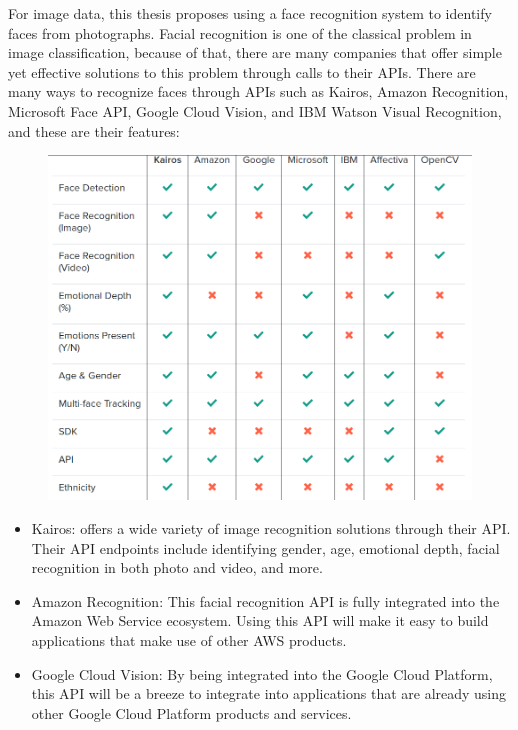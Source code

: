 For image data, this thesis proposes using a face recognition system to identify faces from photographs. Facial recognition is one of the classical problem in image classification, because of that, there are many companies that offer simple yet effective solutions to this problem through calls to their APIs. There are many ways to recognize faces through APIs such as Kairos, Amazon Recognition, Microsoft Face API, Google Cloud Vision, and IBM Watson Visual Recognition, and these are their features:
\begin{center}
	\begin{figure}[H]
		\centering
		\includegraphics[width=1\columnwidth]{images/chap3/face_api.png}
		\label{chap3:face_api_now}
	\end{figure}
\end{center}
\begin{itemize}
	\item  Kairos: offers a wide variety of image recognition solutions through their API. Their API endpoints include identifying gender, age, emotional depth, facial recognition in both photo and video, and more.
	\item Amazon Recognition: This facial recognition API is fully integrated into the Amazon Web Service ecosystem. Using this API will make it easy to build applications that make use of other AWS products.
	\item Google Cloud Vision: By being integrated into the Google Cloud Platform, this API will be a breeze to integrate into applications that are already using other Google Cloud Platform products and services.
\end{itemize}


